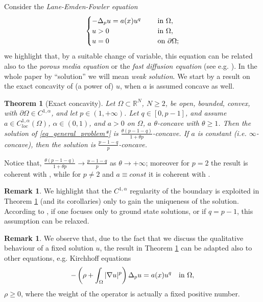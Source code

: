 \documentclass[11pt, reqno]{amsart}
\newtheorem{theorem}[lemma]{Theorem}
\theoremstyle{definition}
\newtheorem{remark}[lemma]{Remark}
\numberwithin{equation}{section}
\newcommand{\R}{\mathbb{R}}
\begin{document}
Consider the \emph{Lane-Emden-Fowler equation}
\begin{equation}\label{eq_general_problem*}
\begin{cases}
-\Delta_p u = a(x) u^q & \quad \hbox{ in $\Omega$},\\ 
u >0 & \quad \hbox{ in $\Omega$}, \\
u =0 & \quad \hbox{ on $\partial \Omega$};
\end{cases}
\end{equation}
we highlight that, by a suitable change of variable, this equation can be related also to the \emph{porous media equation} or the \emph{fast diffusion equation} (see e.g. \cite{LeVa08}).
In the whole paper by ``solution'' we will mean \emph{weak solution}. 
We start by a result on the exact concavity of (a power of) $u$, when $a$ is assumed concave as well.

\begin{theorem}[Exact concavity]
\label{thm_main_conc_exact}
Let $\Omega \subset \R^N$, $N\geq 2$, be open, bounded, convex, with $\partial \Omega \in C^{1,\alpha}$, and let $p\in (1,+\infty)$.
Let $q \in [0,p-1]$, and assume $a \in C^{1,\alpha}_{loc}(\Omega)$, $\alpha \in (0,1)$, and $a > 0$ on $\Omega$, $a$ $\theta$-concave with $\theta \geq 1$. 
Then the solution of \eqref{eq_general_problem*} is $\frac{\theta(p-1-q)}{1+ \theta p}$-concave. 
If $a$ is constant (i.e. $\infty$-concave), then the solution is $\frac{p-1-q}{p}$-concave. 
\end{theorem}

Notice that, $\frac{\theta(p-1-q)}{1+ \theta p} \to \frac{p-1-q}{p}$ as $\theta \to +\infty$; moreover for $p=2$ the result is coherent with \cite[Theorem 4.1]{Ken85}, while for $p\neq 2$ and $a \equiv const$ it is coherent with \cite{Sak87, BMS22}. 

\begin{remark}
We highlight that the $C^{1,\alpha}$ regularity of the boundary is exploited in Theorem \ref{thm_main_conc_exact} (and its corollaries) only to gain the uniqueness of the solution. According to \cite{BeKa02, KaLi06}, if one focuses only to ground state solutions, or if $q=p-1$, this assumption can be relaxed.
\end{remark}

\begin{remark}
We observe that, due to the fact that we discuss the qualitative behaviour of a fixed solution $u$, the result in Theorem \ref{thm_main_conc_exact} can be adapted also to other equations, e.g. Kirchhoff equations
$$-\left( \rho+ \int_{\Omega} |\nabla u|^p\right) \Delta_p u = a(x) u^q \quad \hbox{in $\Omega$},$$
$\rho \geq 0$, where the weight of the operator is actually a fixed positive number.
\end{remark}
\end{document}
